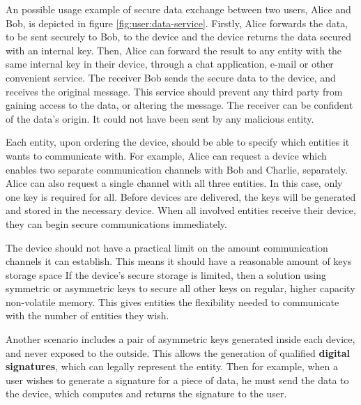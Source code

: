 An possible usage example of secure data exchange between two users, Alice and Bob, is depicted in figure \ref{fig:user:data-service}. Firstly, Alice forwards the data, to be sent securely to Bob, to the device and the device returns the data secured with an internal key. Then, Alice can forward the result to any entity with the same internal key in their device, through a chat application, e-mail or other convenient service.
The receiver Bob sends the secure data to the device, and receives the original message.
This service should prevent any third party from gaining access to the data, or altering the message. The receiver can be confident of the data's origin. It could not have been sent by any malicious entity.

Each entity, upon ordering the device, should be able to specify which entities it wants to communicate with.
For example, Alice can request a device which enables two separate communication channels with Bob and Charlie, separately. Alice can also request a single channel with all three entities. In this case, only one key is required for all.
Before devices are delivered, the keys will be generated and stored in the necessary device. When all involved entities receive their device, they can begin secure communications immediately.

The device should not have a practical limit on the amount communication channels it can establish. This means it should have a reasonable amount of keys storage space
If the device's secure storage is limited, then a solution using symmetric or asymmetric keys to secure all other keys on regular, higher capacity non-volatile memory.
This gives entities the flexibility needed to communicate with the number of entities they wish.

Another scenario includes a pair of asymmetric keys generated inside each device, and never exposed to the outside. This allows the generation of qualified \textbf{digital signatures}, which can legally represent the entity.
Then for example, when a user wishes to generate a signature for a piece of data, he must send the data to the device, which computes and returns the signature to the user.

